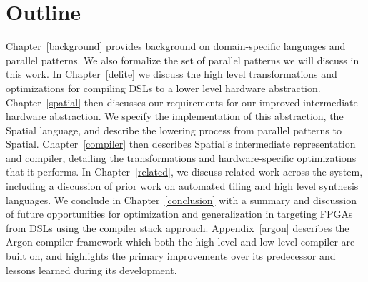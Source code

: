 \section{Outline}
Chapter~\ref{background} provides background on domain-specific languages and parallel patterns.
We also formalize the set of parallel patterns we will discuss in this work.
In Chapter~\ref{delite} we discuss the high level transformations and optimizations for compiling
DSLs to a lower level hardware abstraction.
Chapter~\ref{spatial} then discusses our requirements for our improved intermediate hardware abstraction.
We specify the implementation of this abstraction, the Spatial language, and describe the lowering
process from parallel patterns to Spatial.
Chapter~\ref{compiler} then describes Spatial's intermediate representation and compiler, detailing the transformations and hardware-specific optimizations that it performs.
In Chapter~\ref{related}, we discuss related work across the system, including a discussion of
prior work on automated tiling and high level synthesis languages.
We conclude in Chapter~\ref{conclusion} with a summary and discussion of future opportunities for optimization
and generalization in targeting FPGAs from DSLs using the compiler stack approach.
Appendix~\ref{argon} describes the Argon compiler framework
which both the high level and low level compiler are
built on, and highlights the primary improvements over its predecessor and lessons learned during its development.
